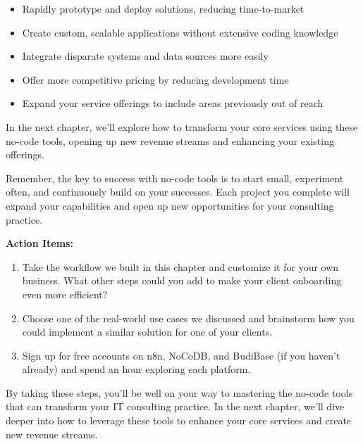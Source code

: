 \begin{itemize}
    \item Rapidly prototype and deploy solutions, reducing time-to-market
    \item Create custom, scalable applications without extensive coding knowledge
    \item Integrate disparate systems and data sources more easily
    \item Offer more competitive pricing by reducing development time
    \item Expand your service offerings to include areas previously out of reach
\end{itemize}

In the next chapter, we'll explore how to transform your core services using these no-code tools, opening up new revenue streams and enhancing your existing offerings.

\begin{importantbox}
    Remember, the key to success with no-code tools is to start small, experiment often, and continuously build on your successes. Each project you complete will expand your capabilities and open up new opportunities for your consulting practice.
\end{importantbox}

\textbf{Action Items:}
\begin{enumerate}
    \item Take the workflow we built in this chapter and customize it for your own business. What other steps could you add to make your client onboarding even more efficient?
    \item Choose one of the real-world use cases we discussed and brainstorm how you could implement a similar solution for one of your clients.
    \item Sign up for free accounts on n8n, NoCoDB, and BudiBase (if you haven't already) and spend an hour exploring each platform.
\end{enumerate}

By taking these steps, you'll be well on your way to mastering the no-code tools that can transform your IT consulting practice. In the next chapter, we'll dive deeper into how to leverage these tools to enhance your core services and create new revenue streams.